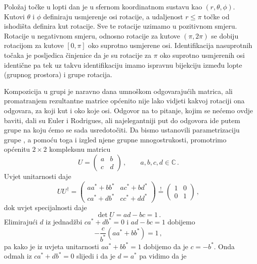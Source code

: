 Položaj točke u lopti dan je u sfernom koordinatnom sustavu kao
$(r, \theta, \phi)$. Kutovi $\theta$ i $\phi$ definiraju usmjerenje
osi rotacije, a udaljenost $r \le \pi$ točke od ishodišta definira kut rotacije.
Sve te rotacije uzimamo u pozitivnom smjeru. Rotacije u negativnom smjeru,
odnosno rotacije za 
kutove $(\pi, 2\pi)$ se dobiju rotacijom za kutove $[0, \pi]$ oko
suprotno usmjerene osi. Identifikacija nasuprotnih točaka je posljedica
činjenice da je su rotacije za $\pi$ oko suprotno usmjerenih osi
identične pa tek uz takvu identifikaciju imamo ispravnu bijekciju
između lopte (grupnog prostora) i  grupe rotacija. 

Kompozicija u grupi  je naravno dana umnoškom odgovarajućih matrica,
ali promatranjem rezultantne matrice općenito nije lako vidjeti kakvoj
rotaciji ona odgovara, za koji kut i oko koje osi. Odgovor na to pitanje,
kojim se nećemo ovdje baviti,
dali su Euler i Rodrigues, ali najelegantniji put do odgovora ide putem
grupe  na koju ćemo se sada usredotočiti.
Da bismo ustanovili parametrizaciju grupe , a pomoću toga i izgled
njene grupne mnogostrukosti, promotrimo općenitu $2 \times 2$ kompleksnu
matricu
\begin{equation}
    U = 
    \begin{pmatrix}
        a & b \\ c & d
    \end{pmatrix} \,, \qquad
    a, b, c, d \in \mathbb{C} \,.
\end{equation}
Uvjet unitarnosti daje
\begin{equation}
    U U^\dagger = \begin{pmatrix}
        aa^*+bb^*  & ac^*+bd^* \\
        ca^*+db^* & c c^* + d d^*
    \end{pmatrix}
    \stackrel{!}{=}
    \begin{pmatrix}
        1 & 0 \\ 0 & 1
    \end{pmatrix} \,,
\end{equation}
dok uvjet specijalnosti daje
\begin{equation}
    \det U = ad - bc = 1 \,.
\end{equation}
Elimirajući $d$ iz jednadžbi $ca^*+db^* =0$ i $ad - bc = 1$ dobijemo
\begin{equation}
    -\frac{c}{b^*}(aa^* + bb^*) = 1 \,,
\end{equation}
pa kako je iz uvjeta unitarnosti $aa^* + bb^* = 1$ dobijemo da je $c=-b^*$.
Onda odmah iz $ca^*+db^* =0$ slijedi i da je $d = a^*$ pa vidimo da je
